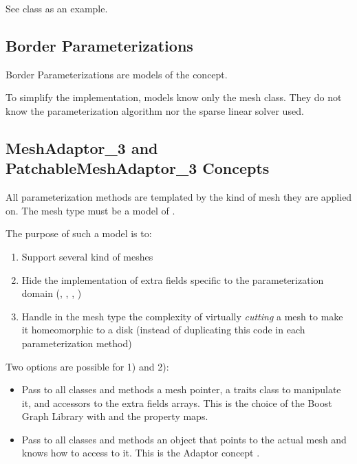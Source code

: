 See 
class as an example.


\subsection{Border Parameterizations}

Border Parameterizations are models of the  concept.

To simplify the implementation,  models know only the
 mesh class. They do not know the parameterization algorithm
nor the sparse linear solver used.


\subsection{MeshAdaptor\_3 and PatchableMeshAdaptor\_3 Concepts}

All parameterization methods are templated by the kind of mesh they are applied on.
The mesh type must be a model of .

The purpose of such a model is to:
\begin{enumerate}
\item Support several kind of meshes
\item Hide the implementation of extra fields specific to the parameterization domain
      (, , , )
\item Handle in the mesh type the complexity of virtually {\em cutting} a mesh
      to make it homeomorphic to a disk (instead of duplicating this
      code in each parameterization method)
\end{enumerate}

Two options are possible for 1) and 2):
\begin{itemize}
\item Pass to all classes and methods a mesh pointer, a traits class to manipulate it,
      and accessors to the extra fields arrays.
      This is the choice of the Boost Graph Library with 
      and the property maps.
\item Pass to all classes and methods an object that points to the actual mesh and knows
      how to access to it. This is the Adaptor concept \cite{cgal:ghjv-dpero-95}.
\end{itemize}

